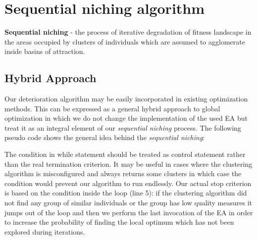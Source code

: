 
\chapter{Sequential niching algorithm}
\label{Sequential niching algorithm}

\begin{definition}\label{def:sequential-niching}
\textbf{Sequential niching} - the process of iterative degradation of fitness
landscape in the areas occupied by clusters of individuals which are assumed
to agglomerate inside basins of attraction.
\end{definition}

\section{Hybrid Approach}
Our deterioration algorithm may be easily incorporated in existing optimization
methods. This can be expressed as a general hybrid approach to global
optimization in which we do not change the implementation of the used EA
but treat it as an integral element of our \textit{sequential niching} process.
The following pseudo code shows the general idea behind the \textit{sequential
niching}:

\begin{algorithmic}[1]
	\ENDIF
\ENDWHILE
{}
\end{algorithmic}


The condition in while statement should be treated as control statement rather
than the real termination criterion. It may be useful in cases where the
clustering algorithm is misconfigured and always returns some clusters in which
case the condition would prevent our algorithm to run endlessly.
Our actual stop criterion is based on the condition inside the loop (line 5): if the clustering algorithm did not find any group of similar individuals or the group has low quality measures it jumps out
of the loop and then we perform the last invocation of the EA in order to
increase the probability of finding the local optimum which has not been explored during iterations.

